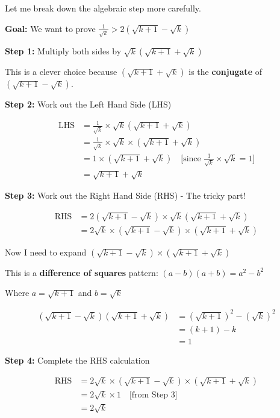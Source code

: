 \documentclass[12pt,a4paper]{article}
\theoremstyle{definition}
\theoremstyle{remark}
\begin{document}
Let me break down the algebraic step more carefully.

\textbf{Goal:} We want to prove $\frac{1}{\sqrt{k}} > 2(\sqrt{k+1} - \sqrt{k})$

\textbf{Step 1:} Multiply both sides by $\sqrt{k}(\sqrt{k+1} + \sqrt{k})$

This is a clever choice because $(\sqrt{k+1} + \sqrt{k})$ is the \textbf{conjugate} of $(\sqrt{k+1} - \sqrt{k})$.

\textbf{Step 2:} Work out the Left Hand Side (LHS)

\begin{align}
\text{LHS} &= \frac{1}{\sqrt{k}} \times \sqrt{k}(\sqrt{k+1} + \sqrt{k})\\
&= \frac{1}{\sqrt{k}} \times \sqrt{k} \times (\sqrt{k+1} + \sqrt{k})\\
&= 1 \times (\sqrt{k+1} + \sqrt{k}) \quad \text{[since $\frac{1}{\sqrt{k}} \times \sqrt{k} = 1$]}\\
&= \sqrt{k+1} + \sqrt{k}
\end{align}

\textbf{Step 3:} Work out the Right Hand Side (RHS) - The tricky part!

\begin{align}
\text{RHS} &= 2(\sqrt{k+1} - \sqrt{k}) \times \sqrt{k}(\sqrt{k+1} + \sqrt{k})\\
&= 2\sqrt{k} \times (\sqrt{k+1} - \sqrt{k}) \times (\sqrt{k+1} + \sqrt{k})
\end{align}

Now I need to expand $(\sqrt{k+1} - \sqrt{k}) \times (\sqrt{k+1} + \sqrt{k})$

This is a \textbf{difference of squares} pattern: $(a - b)(a + b) = a^2 - b^2$

Where $a = \sqrt{k+1}$ and $b = \sqrt{k}$

\begin{align}
(\sqrt{k+1} - \sqrt{k})(\sqrt{k+1} + \sqrt{k}) &= (\sqrt{k+1})^2 - (\sqrt{k})^2\\
&= (k+1) - k\\
&= 1
\end{align}

\textbf{Step 4:} Complete the RHS calculation

\begin{align}
\text{RHS} &= 2\sqrt{k} \times (\sqrt{k+1} - \sqrt{k}) \times (\sqrt{k+1} + \sqrt{k})\\
&= 2\sqrt{k} \times 1 \quad \text{[from Step 3]}\\
&= 2\sqrt{k}
\end{align}
\end{document}
